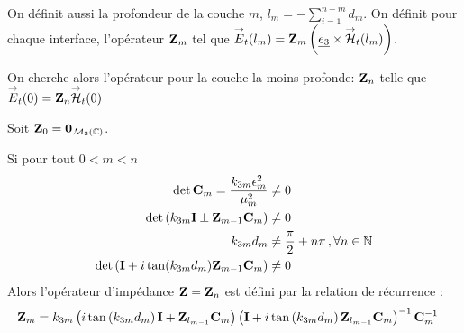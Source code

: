         On définit aussi la profondeur de la couche $m$, $l_m = -\sum_{i=1}^{n-m} d_{m} $. 
        On définit pour chaque interface, l'opérateur $\mathbf{Z}_m$ tel que ${\overset{\rightarrow}{E}}_t(l_m) = \mathbf{Z}_m \left(\underline{e_3} \times {\overset{\rightarrow}{\mathcal{H}}}_t(l_m)\right)$. 

        On cherche alors l'opérateur pour la couche la moins profonde: $\mathbf{Z}_n$ telle que ${\overset{\rightarrow}{E}}_t(0) = \mathbf{Z}_n{\overset{\rightarrow}{\mathcal{H}}}_t(0)$

        \begin{thm}
            Soit $\mathbf{Z}_0 = \mathbf{0}_{\mathcal{M}_2(\mathbb C)}$.

            Si pour tout $0<m < n$
                \begin{align}
                \det{\mathbf{C}_m} = \dfrac{k_{3m}\epsilon_m^2}{\mu_m^2} &\not = 0 \\
                \det\left(k_{3m}\mathbf{I} \pm \mathbf{Z}_{m-1}\mathbf{C}_m \right) &\not = 0 \\
                k_{3m}d_m &\not = \dfrac{\pi}{2}+n\pi\,, \forall n \in \mathbb N \\
                \det\left(\mathbf{I} + i\tan(k_{3m}d_m)\mathbf{Z}_{m-1}\mathbf{C}_m\right) &\not = 0
            \end{align}
            Alors l'opérateur d'impédance $\mathbf{Z} =  \mathbf{Z}_n$ est défini par la relation de récurrence : 
            \begin{align}
            \mathbf{Z}_m &= k_{3m}
            \left(i\tan\left(k_{3m}d_m\right)\mathbf{I} + \mathbf{Z}_{l_{m-1}}\mathbf{C}_m\right)
            \left(\mathbf{I} + i\tan\left(k_{3m}d_m\right)\mathbf{Z}_{l_{m-1}}\mathbf{C}_m\right)^{-1}
            \mathbf{C}_m^{-1}
            \end{align}
        \end{thm}

